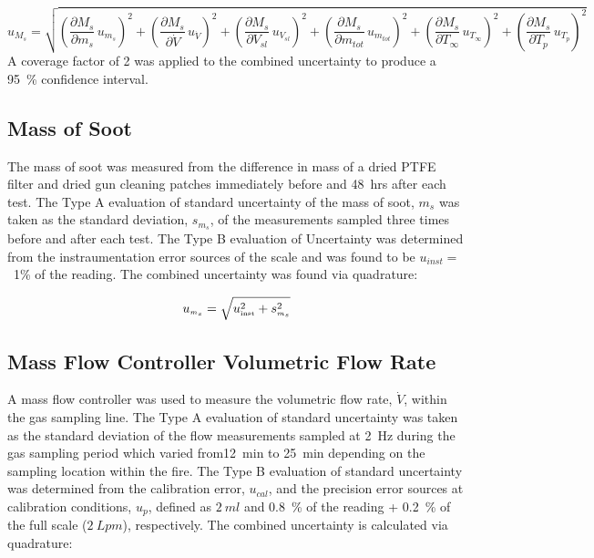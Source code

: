\documentclass[12pt]{article}
\begin{document}
\begin{equation}
\label{eq:soot_mass_frac_uncertainty}
u_{\scriptscriptstyle M_{s}} = \sqrt{{\left(\frac{\partial M_{s}}{\partial m_{s}}\,u_{\scriptscriptstyle m_{s}} \right)}^2+{\left(\frac{\partial M_{s}}{\partial \dot{V} }\,u_{\scriptscriptstyle \dot{V}} \right)}^2+{\left(\frac{\partial M_{s}}{\partial V_{sl}}\,u_{\scriptscriptstyle V_{sl}} \right)}^2+{\left(\frac{\partial M_{s}}{\partial m_{tot}}\,u_{\scriptscriptstyle m_{tot}} \right)}^2+{\left(\frac{\partial M_{s}}{\partial T_{\infty}}\,u_{\scriptscriptstyle T_{\infty}} \right)}^2+{\left(\frac{\partial M_{s}}{\partial T_{p}}\,u_{\scriptscriptstyle T_{p}} \right)}^2}
\end{equation}
A coverage factor of 2 was applied to the combined uncertainty to produce a 95~\% confidence interval.
\subsection{Mass of Soot}
\label{ssec:Mass_of_Soot}

The mass of soot was measured from the difference in mass of a dried PTFE filter and dried gun cleaning patches immediately before and 48~\si{hrs} after each test. The Type A evaluation of standard uncertainty of the mass of soot, $m_{s}$ was taken as the standard deviation, $s_{m_{s}}$, of the measurements sampled three times before and after each test. The Type B evaluation of Uncertainty was determined from the instraumentation error sources of the scale and was found to be $u_{inst}=$~1\% of the reading. The combined uncertainty was found via quadrature:

\begin{equation}
\label{eq:soot_mass_uncertainty}
u_{\scriptscriptstyle m_{s}} = \sqrt{u_{\rm \scriptscriptstyle inst}^2 + s_{\scriptscriptstyle m_{s}}^2}
\end{equation}

\subsection{Mass Flow Controller Volumetric Flow Rate}
\label{ssec:Mass_Flow_Controller_Volumetric_Flow_Rate}

A mass flow controller was used to measure the volumetric flow rate, $\dot{V}$, within the gas sampling line. The Type A evaluation of standard uncertainty was taken as the standard deviation of the flow measurements sampled at 2~\si{Hz} during the gas sampling period which varied from12~\si{min} to 25~\si{min} depending on the sampling location within the fire. The Type B evaluation of standard uncertainty was determined from the calibration error, $u_{cal}$, and the precision error sources at calibration conditions, $u_{p}$, defined as $2~\si{ml}$ and 0.8~\% of the reading + 0.2~\% of the full scale ($2~\si{Lpm}$), respectively. The combined uncertainty is calculated via quadrature:
\end{document}
